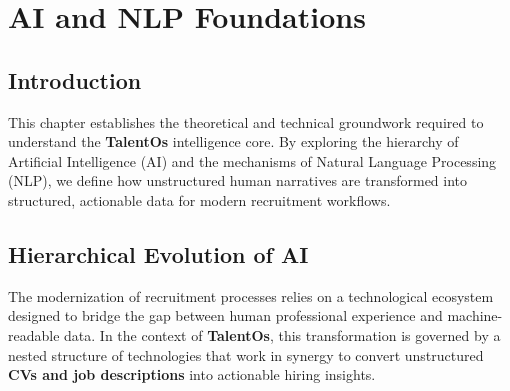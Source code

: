 
\chapter{AI and NLP Foundations}
\label{chap:ai_nlp_foundations}

\minitoc
\newpage

\section*{Introduction}

This chapter establishes the theoretical and technical groundwork required to understand the \textbf{TalentOs} intelligence core. By exploring the hierarchy of Artificial Intelligence (AI) and the mechanisms of Natural Language Processing (NLP), we define how unstructured human narratives are transformed into structured, actionable data for modern recruitment workflows.

\section{Hierarchical Evolution of AI}
\label{sec:ch4:hierarchical_evolution}

The modernization of recruitment processes relies on a technological ecosystem designed to bridge the gap between human professional experience and machine-readable data. In the context of \textbf{TalentOs}, this transformation is governed by a nested structure of technologies that work in synergy to convert unstructured \textbf{CVs and job descriptions} into actionable hiring insights.

